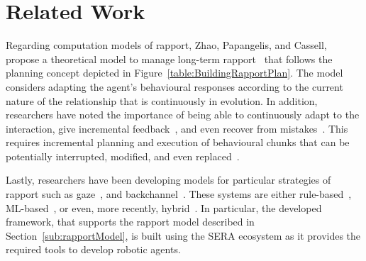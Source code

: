 \section{Related Work}
\label{sec:relatedwork}

Regarding computation models of rapport, Zhao, Papangelis, and Cassell, propose a theoretical model to manage long-term rapport~\cite{Zhao2014, Papangelis2014} that follows the planning concept depicted in Figure~\ref{table:BuildingRapportPlan}. The model considers adapting the agent's behavioural responses according to the current nature of the relationship that is continuously in evolution. In addition, researchers have noted the importance of being able to continuously adapt to the interaction, give incremental feedback~\cite{Kopp2006, Kopp2007, Zwiers2011, Reidsma2011, Visser2014}, and even recover from mistakes~\cite{Kahn2008}. This requires incremental planning and execution of behavioural chunks that can be potentially interrupted, modified, and even replaced~\cite{Reidsma2011, Visser2014, Kopp2007, Zwiers2011}.



Lastly, researchers have been developing models for particular strategies of rapport such as gaze~\cite{Skantze2013, Andrist2015, Mutlu2006, Stanton2014, Peters2005, Andrist2014, Baxter2014, Wang2010}, and backchannel~\cite{Truong2011, Morency2008, Huang2010, Poppe2011, Poppe2010, Kok2012, Niewiadomski2009}. These systems are either rule-based~\cite{Kahn2008, Riek2009, Sidner2006, Hess2010, Melo2011, Wang2009, Tullio2015, Niewiadomski2009, Andrist2015}, \ac{ML}-based~\cite{Kok2012, Mohammad2010, Chao2010, Cakmak2010, Cakmak2012, Thomaz2006, Mutlu2006, Knox2014}, or even, more recently, hybrid~\cite{Schroder2010, Buschmeier2011, Sequeira2016}. In particular, the developed framework, that supports the rapport model described in Section~\ref{sub:rapportModel}, is built using the \acf{SERA} ecosystem as it provides the required tools to develop robotic agents.



